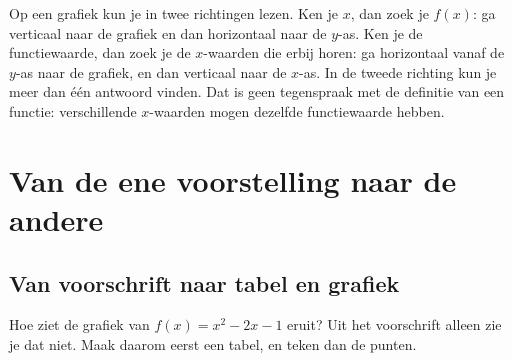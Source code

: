 Op een grafiek kun je in twee richtingen lezen. Ken je $x$, dan zoek je $f(x)$: ga verticaal naar de grafiek en dan horizontaal naar de $y$-as. Ken je de functiewaarde, dan zoek je de $x$-waarden die erbij horen: ga horizontaal vanaf de $y$-as naar de grafiek, en dan verticaal naar de $x$-as. In de tweede richting kun je meer dan één antwoord vinden. Dat is geen tegenspraak met de definitie van een functie: verschillende $x$-waarden mogen dezelfde functiewaarde hebben.


\begin{oefeningen}
\end{oefeningen}

\section{Van de ene voorstelling naar de andere}

\subsection{Van voorschrift naar tabel en grafiek}

Hoe ziet de grafiek van $f(x) = x^2 - 2x - 1$ eruit? Uit het voorschrift alleen zie je dat niet. Maak daarom eerst een tabel, en teken dan de punten.

